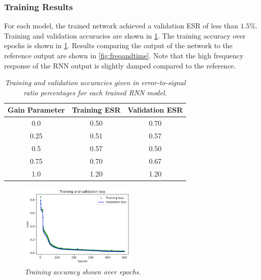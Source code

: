 \documentclass[twoside,a4paper]{article}
\begin{document}
\subsubsection{Training Results}
For each model, the trained network achieved a validation ESR of less than
$1.5\%$. Training and validation accuracies are shown in \cref{table:train}.
The training accuracy over epochs is shown in \cref{fig:training}. Results
comparing the output of the network to the reference output are shown in
\cref{fig:freqandtime}. Note that the high frequency response of the RNN
output is slightly damped compared to the reference.
%
\begin{table}[h!]
    \centering
     \begin{tabular}{||c | c | c||} 
     \hline
     Gain Parameter & Training ESR & Validation ESR \\
     \hline\hline
     0.0  & 0.50 & 0.70 \\
     0.25 & 0.51 & 0.57 \\
     0.5  & 0.57 & 0.50 \\
     0.75 & 0.70 & 0.67 \\
     1.0  & 1.20 & 1.20 \\
     \hline
     \end{tabular}
    \caption{\label{table:train} {\it Training and validation
        accuracies given in error-to-signal ratio percentages
        for each trained RNN model.}}
\end{table}
%
\begin{figure}
    \centering
    \includegraphics[width=0.5\textwidth]{Training.png}
    \caption{\label{fig:training} {\it Training accuracy
        shown over epochs.}}
\end{figure}
%
\end{document}
